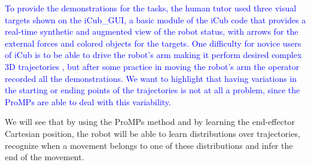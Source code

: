 \documentclass[utf8]{frontiersSCNS} %
\newcommand{\rev}[1]{\textcolor{blue}{#1}}
\begin{document}
\rev{To provide the demonstrations for the tasks, the human tutor used three visual targets shown on the iCub\_GUI, a basic module of the iCub code that provides a real-time synthetic and augmented view of the robot status, with arrows for the external forces and colored objects for the targets. 
One difficulty for novice users of iCub is to be able to drive the robot's arm making it perform desired complex 3D trajectories \cite{ivaldi2017towards}, but after some practice in moving the robot's arm the operator recorded all the demonstrations.
We want to highlight that having variations in the starting or ending points of the trajectories is not at all a problem, since the ProMPs are able to deal with this variability.%
}



We will see that by using the ProMPs method and by learning the end-effector Cartesian position, the robot will be able to learn distributions over trajectories, recognize when a movement belongs to one of these distributions and infer the end of the movement.
\end{document}
